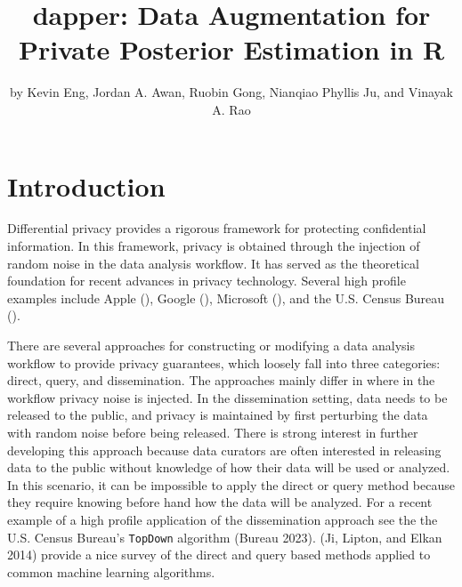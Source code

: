 \title{dapper: Data Augmentation for Private Posterior Estimation in R}


\author{by Kevin Eng, Jordan A. Awan, Ruobin Gong, Nianqiao Phyllis Ju, and Vinayak A. Rao}

\maketitle


\hypertarget{introduction}{%
\section{Introduction}\label{introduction}}

Differential privacy provides a rigorous framework for protecting
confidential information. In this framework, privacy is obtained
through the injection of random noise in the data analysis workflow.
It has served as the theoretical foundation for recent advances in privacy technology. Several high profile
examples include Apple (), Google (), Microsoft (), and the
U.S. Census Bureau ().

There are several approaches for constructing or modifying a data analysis workflow
to provide privacy guarantees, which loosely fall into three categories: direct, query, and dissemination.
The approaches mainly differ in where in the workflow privacy noise is injected.
In the dissemination setting, data needs to be released to the public, and privacy is maintained by first
perturbing the data with random noise before being released. There is strong interest
in further developing this approach because data curators are often interested
in releasing data to the public without knowledge of how their data will
be used or analyzed. In this scenario, it can be impossible to apply the direct or
query method because they require knowing before hand how the data will be analyzed.
For a recent example of a high profile application of the dissemination approach
see the the U.S. Census Bureau's \texttt{TopDown} algorithm (Bureau 2023). (Ji, Lipton, and Elkan 2014)
provide a nice survey of the direct and query based methods applied to
common machine learning algorithms.

